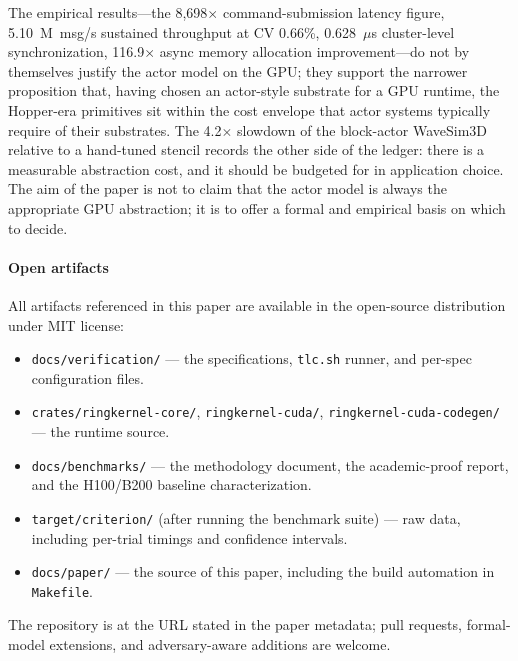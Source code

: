 The empirical results---the 8{,}698$\times$ command-submission
latency figure, 5.10~M~msg/s sustained throughput at CV 0.66\%,
0.628~$\mu$s cluster-level synchronization, 116.9$\times$ async
memory allocation improvement---do not by themselves justify the
actor model on the GPU; they support the narrower proposition that,
having chosen an actor-style substrate for a GPU runtime, the
Hopper-era primitives sit within the cost envelope that actor
systems typically require of their substrates.  The 4.2$\times$
slowdown of the block-actor WaveSim3D relative to a hand-tuned
stencil records the other side of the ledger: there is a
measurable abstraction cost, and it should be budgeted for in
application choice.  The aim of the paper is not to claim that the
actor model is always the appropriate GPU abstraction; it is to
offer a formal and empirical basis on which to decide.

\paragraph{Open artifacts}
All artifacts referenced in this paper are available in the
\system{} open-source distribution under MIT license:

\begin{itemize}
\item \texttt{docs/verification/} — the \TLA{} specifications,
\texttt{tlc.sh} runner, and per-spec configuration files.
\item \texttt{crates/ringkernel-core/}, \texttt{ringkernel-cuda/},
\texttt{ringkernel-cuda-codegen/} — the runtime source.
\item \texttt{docs/benchmarks/} — the methodology document, the
academic-proof report, and the H100/B200 baseline characterization.
\item \texttt{target/criterion/} (after running the benchmark
suite) — raw data, including per-trial timings and confidence
intervals.
\item \texttt{docs/paper/} — the source of this paper, including
the build automation in \texttt{Makefile}.
\end{itemize}

The repository is at the URL stated in the paper metadata; pull
requests, formal-model extensions, and adversary-aware additions
are welcome.
